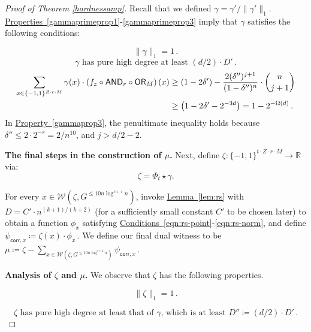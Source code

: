 \documentclass[11pt]{article}
\numberwithin{equation}{section}
\theoremstyle{definition}
\theoremstyle{plain}
\newcommand{\R}{\mathbb R}
\newcommand{\expref}[2]{\hyperref[#2]{#1~\ref{#2}}}
\newcommand{\expeqref}[2]{\hyperref[#2]{#1~\eqref{#2}}}
\newcommand{\OR}{\mathsf{ OR}}
\newcommand{\bits}{\{-1,1\}}
\newcommand{\ls}{\star}
\newcommand{\AND}{\mathsf{AND}}
\begin{document}
\begin{proof}[Proof of Theorem \ref{hardnessamp}]
	Recall that we defined $\gamma = \gamma'/\|\gamma'\|_1$. \expeqref{Properties}{gammaprimeprop1}-\eqref{gammaprimeprop3} imply that $\gamma$ 
satisfies the following conditions: %
	
	\begin{equation}
	\label{gammaprop1}
	\|\gamma\|_1 = 1\,.
	\end{equation}
	\begin{equation}
	\label{gammaprop2}
	\gamma \text{ has pure high degree at least } (d/2) \cdot D'\,.
	\end{equation}
	\begin{align}
	\sum_{x \in \bits^{Z \cdot r \cdot M}} \gamma(x) \cdot \left(f_z \circ \AND_r \circ \OR_M\right)(x) &\geq 
	(1-2\delta') - \frac{2 (\delta'')^{j+1}}{(1-\delta'')^n} \cdot {n \choose j+1} \notag\\ &\geq 
	\left(1-2\delta' - 2^{-3d}\right) = 1-2^{-\Omega(d)}\,.
	\label{gammaprop3}
	\end{align}
	In \expeqref{Property}{gammaprop3}, the penultimate inequality holds because $\delta'' \leq 2 \cdot 2^{-r} =2/n^{10}$, and $j > d/2-2$. 
	
	\medskip \noindent \textbf{The final steps in the construction of $\mu$.}
	Next, define $\zeta \colon \bits^{ t \cdot Z \cdot r \cdot M} \to \R$ via:
	$$\zeta = \Phi_t \ls \gamma.$$  
	
	For every $x \in \mathcal{W}\left(\zeta, G^{\leq 10 n \log^{c + 4} n}\right)$, invoke \expref{Lemma}{lem:rs} with $D=C' \cdot n^{(k+1)/(k+2)}$ (for a sufficiently
small constant $C'$ to be chosen later) to obtain a function $\phi_x$
satisfying  \expeqref{Conditions}{eqn:rs-point}-\eqref{eqn:rs-norm}, and
define $\psi_{\mathsf{corr}, x}
\coloneqq %
\zeta(x) \cdot \phi_x$\,.
	We define our final dual witness to be $\mu \coloneqq  \zeta - \sum_{x \in \mathcal{W}\left(\zeta, G^{\leq 10 n \log^{c + 4} n}\right)} \psi_{\mathsf{corr}, x}$\,.
	
\medskip \noindent \textbf{Analysis of $\zeta$ and $\mu$.} %
%
%
%
We observe that $\zeta$ has the following properties.
	
	\begin{equation}\label{zeta2prop1}
	\|\zeta\|_1=1\,.
	\end{equation}
	
	\begin{equation}\label{zeta2prop2}
	\zeta \text{ has pure high degree at least that of } \gamma \text{, which is  at least } D''\coloneqq (d/2) \cdot D'\,.
	\end{equation}
	

\end{proof}
\end{document}
